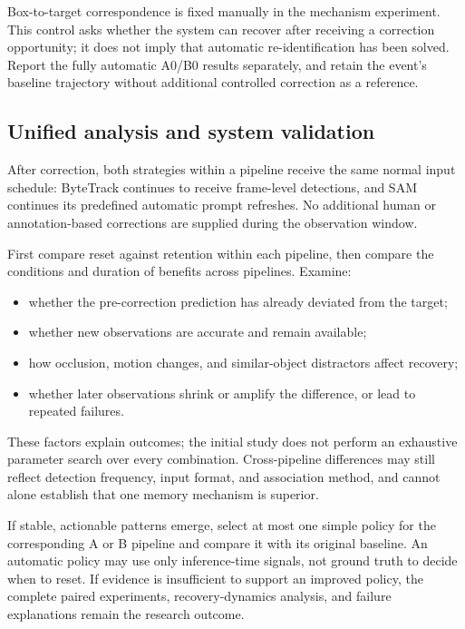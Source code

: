 \documentclass{article}
\begin{document}
Box-to-target correspondence is fixed manually in the mechanism experiment. This control asks whether the system can recover after receiving a correction opportunity; it does not imply that automatic re-identification has been solved. Report the fully automatic A0/B0 results separately, and retain the event's baseline trajectory without additional controlled correction as a reference.

\subsection{Unified analysis and system validation}

After correction, both strategies within a pipeline receive the same normal input schedule: ByteTrack continues to receive frame-level detections, and SAM continues its predefined automatic prompt refreshes. No additional human or annotation-based corrections are supplied during the observation window.

First compare reset against retention within each pipeline, then compare the conditions and duration of benefits across pipelines. Examine:

\begin{itemize}

\item whether the pre-correction prediction has already deviated from the target;

\item whether new observations are accurate and remain available;

\item how occlusion, motion changes, and similar-object distractors affect recovery;

\item whether later observations shrink or amplify the difference, or lead to repeated failures.

\end{itemize}

These factors explain outcomes; the initial study does not perform an exhaustive parameter search over every combination. Cross-pipeline differences may still reflect detection frequency, input format, and association method, and cannot alone establish that one memory mechanism is superior.

If stable, actionable patterns emerge, select at most one simple policy for the corresponding A or B pipeline and compare it with its original baseline. An automatic policy may use only inference-time signals, not ground truth to decide when to reset. If evidence is insufficient to support an improved policy, the complete paired experiments, recovery-dynamics analysis, and failure explanations remain the research outcome.
\end{document}
